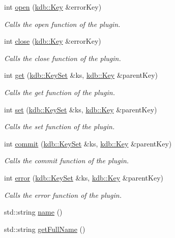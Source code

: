 \begin{DoxyCompactItemize}
int \hyperlink{classkdb_1_1tools_1_1Plugin_a680a490123b5290441d76ef2c1e3f1fa}{open} (\hyperlink{classkdb_1_1Key}{kdb\+::\+Key} \&error\+Key)
\begin{DoxyCompactList}\small\item\em Calls the open function of the plugin. \end{DoxyCompactList}\item 
int \hyperlink{classkdb_1_1tools_1_1Plugin_a40b5fd413f3f6da735680ed8d7c8a6a2}{close} (\hyperlink{classkdb_1_1Key}{kdb\+::\+Key} \&error\+Key)
\begin{DoxyCompactList}\small\item\em Calls the close function of the plugin. \end{DoxyCompactList}\item 
int \hyperlink{classkdb_1_1tools_1_1Plugin_a2aa6ff55f9cf81a59d2a8d271fe68e0f}{get} (\hyperlink{classkdb_1_1KeySet}{kdb\+::\+Key\+Set} \&ks, \hyperlink{classkdb_1_1Key}{kdb\+::\+Key} \&parent\+Key)
\begin{DoxyCompactList}\small\item\em Calls the get function of the plugin. \end{DoxyCompactList}\item 
int \hyperlink{classkdb_1_1tools_1_1Plugin_abf84d512b48f6fa1b89636217537cde0}{set} (\hyperlink{classkdb_1_1KeySet}{kdb\+::\+Key\+Set} \&ks, \hyperlink{classkdb_1_1Key}{kdb\+::\+Key} \&parent\+Key)
\begin{DoxyCompactList}\small\item\em Calls the set function of the plugin. \end{DoxyCompactList}\item 
int \hyperlink{classkdb_1_1tools_1_1Plugin_ac1a731f0fa0628a51ca9edf6385e8c3d}{commit} (\hyperlink{classkdb_1_1KeySet}{kdb\+::\+Key\+Set} \&ks, \hyperlink{classkdb_1_1Key}{kdb\+::\+Key} \&parent\+Key)
\begin{DoxyCompactList}\small\item\em Calls the commit function of the plugin. \end{DoxyCompactList}\item 
int \hyperlink{classkdb_1_1tools_1_1Plugin_a8ec348b49a34ef17fda64cb289b8cf64}{error} (\hyperlink{classkdb_1_1KeySet}{kdb\+::\+Key\+Set} \&ks, \hyperlink{classkdb_1_1Key}{kdb\+::\+Key} \&parent\+Key)
\begin{DoxyCompactList}\small\item\em Calls the error function of the plugin. \end{DoxyCompactList}\item 
std\+::string \hyperlink{classkdb_1_1tools_1_1Plugin_ae4b82f943d0cdb0dd355924aa3201d6f}{name} ()
\item 
std\+::string \hyperlink{classkdb_1_1tools_1_1Plugin_acbe982e7bbb71aafb49b0d632e8650c9}{get\+Full\+Name} ()
\end{DoxyCompactItemize}
